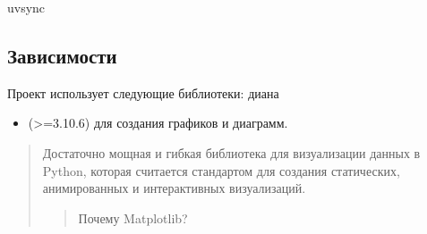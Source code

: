 \documentclass[a4paper,11pt,russian,openany,oneside]{sphinxmanual}
\begin{document}
\begin{sphinxVerbatim}[commandchars=\\\{\}]
uvsync
\end{sphinxVerbatim}


\subsection{Зависимости}
\label{\detokenize{installation:id4}}
\sphinxAtStartPar
Проект использует следующие библиотеки: диана
\begin{itemize}
\item {} 
\sphinxAtStartPar
{} (>=3.10.6) \sphinxhyphen{} для создания графиков и диаграмм.

\end{itemize}
\begin{quote}

\sphinxAtStartPar
Достаточно мощная и гибкая библиотека для визуализации данных в Python,
которая считается стандартом для создания статических, анимированных и интерактивных визуализаций.
\begin{quote}

\sphinxAtStartPar
Почему Matplotlib?
\end{quote}
\end{quote}
\end{document}
